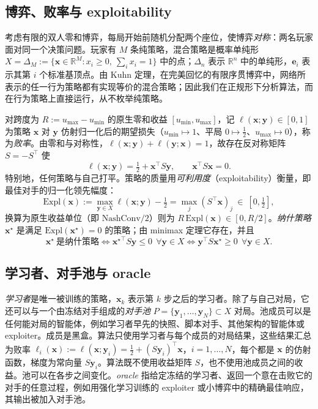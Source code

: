 \documentclass{article}
\theoremstyle{plain}
\theoremstyle{remark}
\newcommand{\Expl}{\mathrm{Expl}}
\newcommand{\simplex}{\Delta}
\newcommand{\bx}{{\bm{x}}}
\newcommand{\by}{{\bm{y}}}
\newcommand{\be}{{\bm{e}}}
\newcommand{\xs}{\bx^{\star}}
\begin{document}
\subsection{博弈、败率与 exploitability}

考虑有限的双人零和博弈，每局开始前随机分配两个座位，使博弈\emph{对称}：两名玩家面对同一个决策问题。玩家有 $M$ 条纯策略，混合策略是概率单纯形 $X=\simplex_M:=\{\bx\in\mathbb R^M:x_i\ge0,\ \sum_ix_i=1\}$ 中的点；$\simplex_n$ 表示 $\mathbb R^n$ 中的单纯形，$\be_i$ 表示其第 $i$ 个标准基顶点。由 Kuhn 定理\citep{kuhn1953}，在完美回忆的有限序贯博弈中，网络所表示的任一行为策略都有实现等价的混合策略；因此我们在正规形下分析算法，而在行为策略上直接运行，从不枚举纯策略。

对跨度为 $R:=u_{\max}-u_{\min}$ 的原生零和收益 $[u_{\min},u_{\max}]$，记 $\ell(\bx;\by)\in[0,1]$ 为策略 $\bx$ 对 $\by$ 仿射归一化后的期望损失（$u_{\min}\mapsto1$、平局 $0\mapsto\tfrac12$、$u_{\max}\mapsto0$），称为\emph{败率}。由零和与对称性，$\ell(\bx;\by)+\ell(\by;\bx)=1$，故存在反对称矩阵 $S=-S^\top$ 使
\[
\ell(\bx;\by)=\tfrac12+\bx^\top S\by,\qquad \bx^\top S\bx=0 .
\]
特别地，任何策略与自己打平。策略的质量用\emph{可利用度}（exploitability）衡量，即最佳对手的归一化领先幅度：
\[
\Expl(\bx):=\max_{\by\in X}\ell(\bx;\by)-\tfrac12=\max_j(S^\top \bx)_j\ \in\ [0,\tfrac12] ,
\]
换算为原生收益单位（即 $\mathrm{NashConv}/2$）则为 $R\,\Expl(\bx)\in[0,R/2]$。\emph{纳什策略} $\xs$ 是满足 $\Expl(\xs)=0$ 的策略；由 minimax 定理它存在\citep{vonneumann1928}，并且
\begin{equation}
\xs\ \text{是纳什策略}\iff {\xs}^\top S\by\le0\ \ \forall \by\in X\iff \by^\top S\xs\ge0\ \ \forall \by\in X .
\label{eq:nash}
\end{equation}

\subsection{学习者、对手池与 oracle}
\label{sec:setting}

\emph{学习者}是唯一被训练的策略，$\bx_k$ 表示第 $k$ 步之后的学习者。除了与自己对局，它还可以与一个由冻结对手组成的\emph{对手池} $P=\{\by_1,\dots,\by_N\}\subset X$ 对局。池成员可以是任何能对局的智能体，例如学习者早先的快照、脚本对手、其他架构的智能体或 exploiter。成员是黑盒。算法只使用学习者与每个成员的对局结果，这些结果汇总为败率 $\ell_i(\bx):=\ell(\bx;\by_i)=\tfrac12+(S\by_i)^\top\bx$，$i=1,\dots,N$，每个都是 $\bx$ 的仿射函数，梯度为常向量 $S\by_i$。算法既不使用收益矩阵 $S$，也不使用池成员之间的收益。池可以在各步之间变化。\emph{oracle} 指给定冻结的学习者、返回一个意在击败它的对手的任意过程，例如用强化学习训练的 exploiter 或小博弈中的精确最佳响应，其输出被加入对手池。
\end{document}
